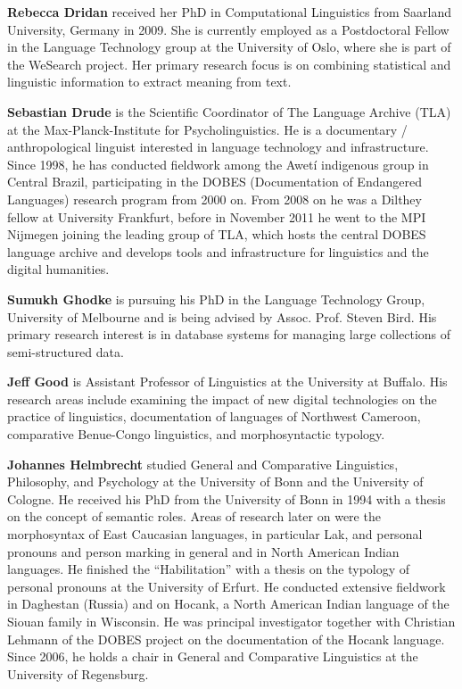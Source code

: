 \textbf{Rebecca Dridan} received her PhD in Computational Linguistics from
Saarland University, Germany in 2009. She is currently employed as a
Postdoctoral Fellow in the Language Technology group at the University
of Oslo, where she is part of the WeSearch project. Her primary
research focus is on combining statistical and linguistic information
to extract meaning from text.


\textbf{Sebastian Drude} is the Scientific Coordinator of The Language Archive (TLA) at the Max-Planck-Institute for Psycholinguistics. He is a documentary / anthropological linguist interested in language technology and infrastructure.  Since 1998, he has conducted fieldwork among the Awetí indigenous group in Central Brazil, participating in the DOBES (Documentation of Endangered Languages) research program from 2000 on.  From 2008 on he was a Dilthey fellow at University Frankfurt, before in November 2011 he went to the MPI Nijmegen joining the leading group of TLA, which hosts the central DOBES language archive and develops tools and infrastructure for linguistics and the digital humanities.

\textbf{Sumukh Ghodke} is pursuing his PhD in the Language Technology Group,
University of Melbourne and is being advised by Assoc. Prof. Steven Bird.
His primary research interest is in database systems for managing large
collections of semi-structured data.
 
 

\textbf{Jeff Good} is Assistant Professor of Linguistics at the University at Buffalo. His research areas include examining the impact of new digital technologies on the practice of linguistics, documentation of languages of Northwest Cameroon, comparative Benue-Congo linguistics, and morphosyntactic typology.



\textbf{Johannes Helmbrecht} studied General and Comparative Linguistics, Philosophy,
and Psychology at the University of Bonn and the University of Cologne. He
received his PhD from the University of Bonn in 1994 with a thesis on the
concept of semantic roles. Areas of research later on were the morphosyntax of
East Caucasian languages, in particular Lak, and personal pronouns and person
marking in general and in North American Indian languages. He finished the
``Habilitation'' with a
thesis on the typology of personal pronouns at the University of Erfurt. He
conducted extensive fieldwork in Daghestan (Russia) and on Hocank, a North
American Indian language of the Siouan family in Wisconsin. He was principal
investigator together with Christian Lehmann of the DOBES project on the
documentation of the Hocank language. Since 2006, he  holds a chair in General
and Comparative Linguistics at the University of Regensburg.


